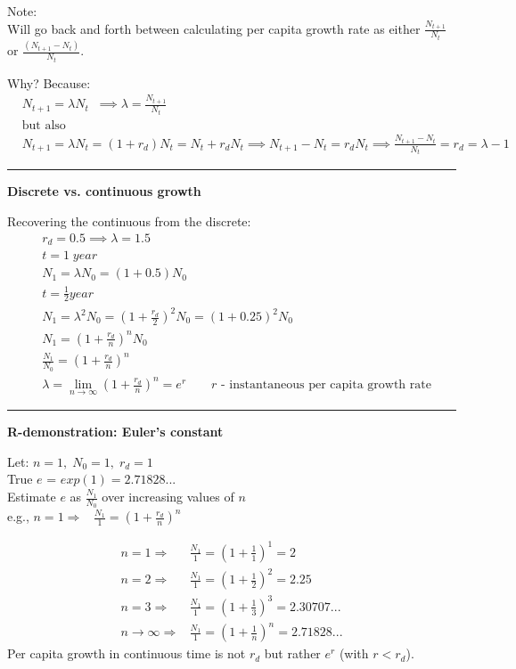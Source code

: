 \documentclass{article}
\newcommand*\circled[1]{\tikz[baseline=(char.base)]{
            \node[shape=circle,draw,inner sep=2pt] (char) {#1};}}
\begin{document}
Note:\\
Will go back and forth between calculating per capita growth rate as either $\frac{N_{t+1}}{N_t}$ or $\frac{(N_{t+1}-N_t)}{N_t}$.

Why? Because:
\begin{align*}
& N_{t+1} =\lambda N_t \;\; 
\implies \lambda = \frac{N_{t+1}}{N_t}\\
& \text{but also}  \\ 
& N_{t+1}=\lambda N_t = (1+r_d)N_t = N_t + r_d N_t
\implies N_{t+1}-N_t = r_d N_t
\implies \frac{N_{t+1}-N_t}{N_t}=r_d = \lambda -1
\end{align*}

\rule[0.5ex]{\linewidth}{1pt}

\break

\circled{2}
\textbf{Discrete vs. continuous growth}

Recovering the continuous from the discrete:
\begin{align*}
	& r_d=0.5 \implies \lambda=1.5 \\ 
	& t=1 \; year\\
	& N_1 = \lambda N_0=(1+0.5)N_0\\[1.5em]
	& t=\frac{1}{2} year \\
	& N_1 = \lambda^2 N_0 = \left(1+\tfrac{r_d}{2}\right)^2 N_0 = (1+0.25)^2 N_0 \\[1.5em]
	& N_1 = \left(1+\tfrac{r_d}{n}\right)^n N_0\\
	& \frac{N_1}{N_0}=\left(1+\tfrac{r_d}{n}\right)^n\\[1.5em]
	& \lambda = \lim_{n \to \infty}\left(1+\tfrac{r_d}{n}\right)^n = e^r \quad \quad r \text{ - 
	instantaneous per capita growth rate}
\end{align*}



\rule[0.5ex]{\linewidth}{1pt}

\textbf{R-demonstration: Euler's constant}

Let: $n=1, \; N_0=1, \; r_d=1$\\
True $e$ = $exp(1) = 2.71828...$\\
Estimate $e$ as $\tfrac{N_1}{N_0}$ over increasing values of $n$\\
\-\hspace{1cm} e.g., $n=1 \Rightarrow  \;\;\; \frac{N_1}{1}=\left(1+\tfrac{r_d}{n}\right)^n $

\begin{align*}
	n=1 \Rightarrow & \frac{N_1}{1}= \left(1+\tfrac{1}{1}\right)^1= 2 \\
	n=2 \Rightarrow & \frac{N_1}{1}= \left(1+\tfrac{1}{2}\right)^2= 2.25 \\
	n=3 \Rightarrow & \frac{N_1}{1}= \left(1+\tfrac{1}{3}\right)^3= 2.30707... \\
	n \to\infty \Rightarrow & \frac{N_1}{1} = \left(1+\tfrac{1}{n}\right)^n =  2.71828...
\end{align*}
Per capita growth in continuous time is not $r_d$ but rather $e^r$ (with $r < r_d$).
\end{document}
